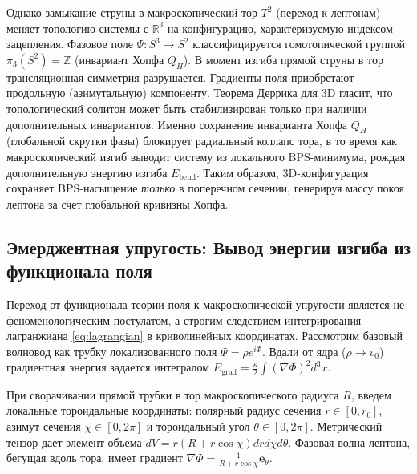 \documentclass[11pt,a4paper]{article}
\begin{document}
Однако замыкание струны в макроскопический тор $T^2$ (переход к лептонам) меняет топологию системы с $\mathbb{R}^3$ на конфигурацию, характеризуемую индексом зацепления. Фазовое поле $\Psi: S^3 \to S^2$ классифицируется гомотопической группой $\pi_3(S^2) = \mathbb{Z}$ (инвариант Хопфа $Q_H$).
В момент изгиба прямой струны в тор трансляционная симметрия разрушается. Градиенты поля приобретают продольную (азимутальную) компоненту. Теорема Деррика для 3D гласит, что топологический солитон может быть стабилизирован только при наличии дополнительных инвариантов. Именно сохранение инварианта Хопфа $Q_H$ (глобальной скрутки фазы) блокирует радиальный коллапс тора, в то время как макроскопический изгиб выводит систему из локального BPS-минимума, рождая дополнительную энергию изгиба $E_{\text{bend}}$. Таким образом, 3D-конфигурация сохраняет BPS-насыщение \textit{только} в поперечном сечении, генерируя массу покоя лептона за счет глобальной кривизны Хопфа.

\subsection{Эмерджентная упругость: Вывод энергии изгиба из функционала поля}
Переход от функционала теории поля к макроскопической упругости является не феноменологическим постулатом, а строгим следствием интегрирования лагранжиана \eqref{eq:lagrangian} в криволинейных координатах.
Рассмотрим базовый волновод как трубку локализованного поля $\Psi = \rho e^{i\Phi}$. Вдали от ядра ($\rho \to v_0$) градиентная энергия задается интегралом $E_{\text{grad}} = \frac{\kappa}{2} \int (\nabla \Phi)^2 d^3x$.

При сворачивании прямой трубки в тор макроскопического радиуса $R$, введем локальные тороидальные координаты: полярный радиус сечения $r \in [0, r_0]$, азимут сечения $\chi \in [0, 2\pi]$ и тороидальный угол $\theta \in [0, 2\pi]$. Метрический тензор дает элемент объема $dV = r(R + r\cos\chi) dr d\chi d\theta$.
Фазовая волна лептона, бегущая вдоль тора, имеет градиент $\nabla \Phi = \frac{1}{R + r\cos\chi} \mathbf{e}_\theta$.
\end{document}

